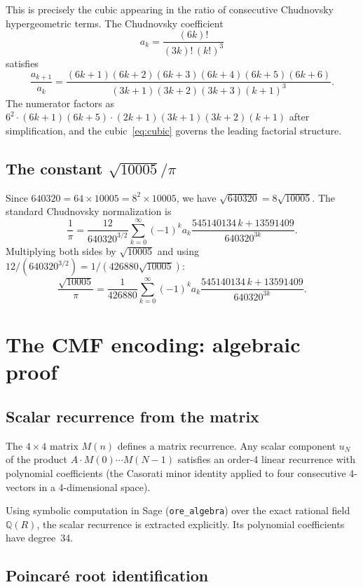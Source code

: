 \documentclass[11pt]{article}
\begin{document}
This is precisely the cubic appearing in the ratio of
consecutive Chudnovsky hypergeometric terms.  The
Chudnovsky coefficient
\[
a_k = \frac{(6k)!}{(3k)!\,(k!)^3}
\]
satisfies
\[
\frac{a_{k+1}}{a_k}
= \frac{(6k+1)(6k+2)(6k+3)(6k+4)(6k+5)(6k+6)}{(3k+1)(3k+2)(3k+3)(k+1)^3}.
\]
The numerator factors as
$6^2 \cdot (6k+1)(6k+5) \cdot (2k+1)(3k+1)(3k+2)(k+1)$
after simplification, and the cubic~\eqref{eq:cubic}
governs the leading factorial structure.

\subsection{The constant $\sqrt{10005}/\pi$}

Since $640320 = 64 \times 10005 = 8^2 \times 10005$,
we have $\sqrt{640320} = 8\sqrt{10005}$.
The standard Chudnovsky normalization is
\[
\frac{1}{\pi}
= \frac{12}{640320^{3/2}}
  \sum_{k=0}^{\infty} (-1)^k a_k
  \frac{545140134\,k + 13591409}{640320^{3k}}.
\]
Multiplying both sides by $\sqrt{10005}$ and using
$12/(640320^{3/2}) = 1/(426880\sqrt{10005})$:
\begin{equation}\label{eq:chud}
\boxed{
\frac{\sqrt{10005}}{\pi}
= \frac{1}{426880}
  \sum_{k=0}^{\infty} (-1)^k a_k
  \frac{545140134\,k + 13591409}{640320^{3k}}.
}
\end{equation}

\section{The CMF encoding: algebraic proof}

\subsection{Scalar recurrence from the matrix}

The $4\times 4$ matrix $M(n)$ defines a matrix recurrence.
Any scalar component $u_N$ of the product
$A \cdot M(0) \cdots M(N-1)$ satisfies an order-4 linear
recurrence with polynomial coefficients (the Casorati minor
identity applied to four consecutive 4-vectors in a
4-dimensional space).

Using symbolic computation in Sage (\texttt{ore\_algebra})
over the exact rational field $\mathbb{Q}(R)$, the scalar
recurrence is extracted explicitly.  Its polynomial
coefficients have degree~34.

\subsection{Poincar\'e root identification}
\end{document}
